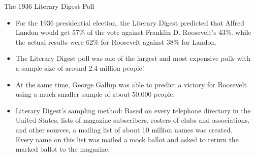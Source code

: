 \documentclass[serif,envcountsect,table,t]{beamer}%
\begin{document}
\begin{frame}{The 1936 Literary Digest Poll}
  \begin{itemize}
  \item For the 1936 presidential election, the Literary Digest predicted that Alfred Landon would get 57\% of the vote against Franklin D. Roosevelt's 43\%, while the actual results were 62\% for Roosevelt against 38\% for Landon.
  \item The Literary Digest poll was one of the largest and most expensive polls with a sample size of around 2.4 million people!
  \item At the same time, George Gallup was able to predict a victory for Roosevelt using a much smaller sample of about 50,000 people.
  \item Literary Digest's sampling method: Based on every telephone directory in the United States, lists of magazine subscribers, rosters of clubs and associations, and other sources, a mailing list of about 10 million names was created. Every name on this list was mailed a mock ballot and asked to return the marked ballot to the magazine.
  \end{itemize}
  

\end{frame}
\end{document}
